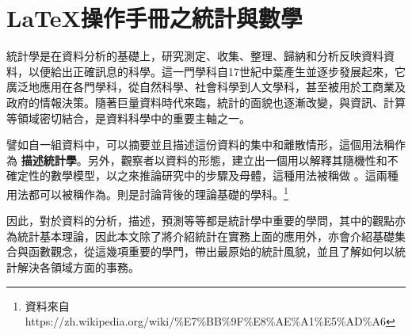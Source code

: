 %



%
\chapter{ \LaTeX{\MJH 操作手冊之統計與數學}}	
	統計學是在資料分析的基礎上，研究測定、收集、整理、歸納和分析反映資料資料，以便給出正確訊息的科學。這一門學科自17世紀中葉產生並逐步發展起來，它廣泛地應用在各門學科，從自然科學、社會科學到人文學科，甚至被用於工商業及政府的情報決策。隨著巨量資料時代來臨，統計的面貌也逐漸改變，與資訊、計算等領域密切結合，是資料科學中的重要主軸之一。

譬如自一組資料中，可以摘要並且描述這份資料的集中和離散情形，這個用法稱作為 \textbf{{\MJHmarker 描述統計學}}。另外，觀察者以資料的形態，建立出一個用以解釋其隨機性和不確定性的數學模型，以之來推論研究中的步驟及母體，這種用法被稱做 \textbf{}。這兩種用法都可以被稱作為\textbf{}。\textbf{}則是討論背後的理論基礎的學科。\footnote{資料來自 https://zh.wikipedia.org/wiki/\%E7\%BB\%9F\%E8\%AE\%A1\%E5\%AD\%A6}

因此，對於資料的分析，描述，預測等等都是統計學中重要的學問，其中\textbf{}的觀點亦為統計基本理論，因此本文除了將介紹統計在實務上面的應用外，亦會介紹基礎集合與函數觀念，從這幾項重要的學門，帶出最原始的統計風貌，並且了解如何以統計解決各領域方面的事務。\\
\bigskip
